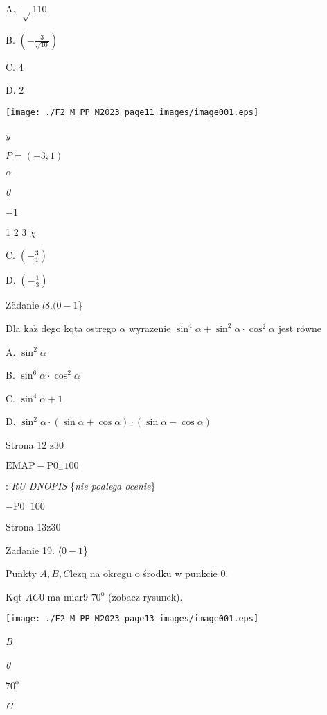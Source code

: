 \documentclass[a4paper,12pt]{article}
\begin{document}
A. -$\sqrt{}$110

B. $(-\displaystyle \frac{3}{\sqrt{10}})$

C. 4

D. 2
\begin{center}
\texttt{[image: ./F2\_M\_PP\_M2023\_page11\_images/image001.eps]}
\end{center}
{\it y}

$P=(-3,1)$

$\alpha$

{\it 0}

$-1$

1 2 3  $\chi$

C. $(-\displaystyle \frac{3}{1})$

D. $(-\displaystyle \frac{1}{3})$

Zädanie $l8. (0-1$\}

Dla $\mathrm{k}\mathrm{a}\dot{\mathrm{z}}$ dego kqta ostrego $\alpha$ wyrazenie $\sin^{4}\alpha+\sin^{2}\alpha\cdot\cos^{2}\alpha$ jest równe

A. $\sin^{2}\alpha$

B. $\sin^{6}\alpha\cdot\cos^{2}\alpha$

C. $\sin^{4}\alpha+1$

D. $\sin^{2}\alpha\cdot(\sin\alpha+\cos\alpha)\cdot(\sin\alpha-\cos\alpha)$

Strona 12 z30

$\mathrm{E}\mathrm{M}\mathrm{A}\mathrm{P}-\mathrm{P}0_{-}100$





: {\it RU DNOPIS} \{{\it nie podlega ocenie}\}

$-\mathrm{P}0_{-}100$

Strona 13z30





Zadanie 19. $\langle 0-1$\}

Punkty $A, B, C \mathrm{l}\mathrm{e}\dot{\mathrm{z}}\mathrm{q}$ na okregu o środku w punkcie 0.

Kqt $AC0$ ma miar9 $70^{\mathrm{o}}$ (zobacz rysunek).
\begin{center}
\texttt{[image: ./F2\_M\_PP\_M2023\_page13\_images/image001.eps]}
\end{center}
{\it B}

{\it 0}

$70^{\mathrm{o}}$

{\it C}
\end{document}
